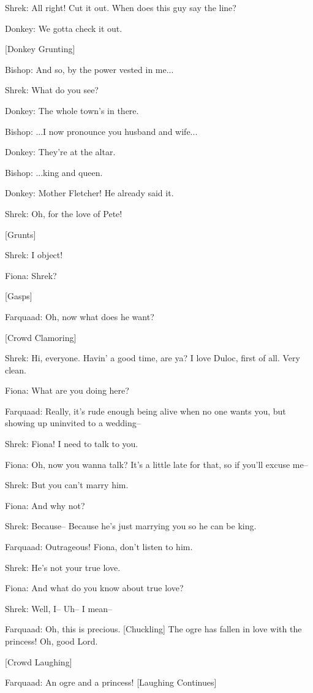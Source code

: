 \documentclass{article}
\begin{document}
Shrek:
All right! Cut it out. When does this guy say the line?

Donkey:
We gotta check it out.

[Donkey Grunting]

Bishop:
And so, by the power vested in me...

Shrek:
What do you see?

Donkey:
The whole town's in there.

Bishop:
...I now pronounce you husband and wife...

Donkey:
They're at the altar.

Bishop:
...king and queen.

Donkey:
Mother Fletcher! He already said it.

Shrek:
Oh, for the love of Pete!

[Grunts]

Shrek:
I object!

Fiona:
Shrek?

[Gasps]

Farquaad:
Oh, now what does he want?

[Crowd Clamoring]

Shrek:
Hi, everyone. Havin' a good time, are ya? I love Duloc, first of all. Very clean.

Fiona:
What are you doing here?

Farquaad:
Really, it's rude enough being alive when no one wants you, but showing up uninvited to a wedding--

Shrek:
Fiona! I need to talk to you.

Fiona:
Oh, now you wanna talk? It's a little late for that, so if you'll excuse me--

Shrek:
But you can't marry him.

Fiona:
And why not?

Shrek:
Because-- Because he's just marrying you so he can be king.

Farquaad:
Outrageous! Fiona, don't listen to him.

Shrek:
He's not your true love.

Fiona:
And what do you know about true love?

Shrek:
Well, I-- Uh-- I mean--

Farquaad:
Oh, this is precious. [Chuckling] The ogre has fallen in love with the princess! Oh, good Lord.

[Crowd Laughing]

Farquaad:
An ogre and a princess! [Laughing Continues]
\end{document}
